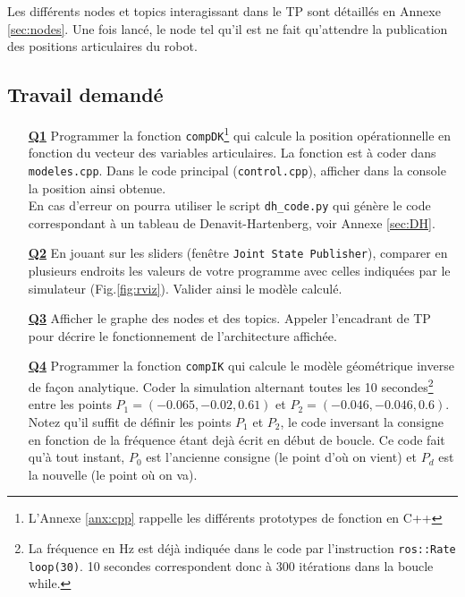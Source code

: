 \documentclass[12pt,a4paper]{article}
\begin{document}
Les différents nodes et topics interagissant dans le TP sont détaillés en Annexe \ref{sec:nodes}.
Une fois lancé, le node tel qu'il est ne fait qu'attendre la publication des positions articulaires du robot.
 
 \subsection{Travail demandé}
 \label{travail2s}

\begin{itemize}
 \medskip\item[\textbf{\underline{Q1}}] Programmer la fonction \texttt{compDK}\footnote{ L'Annexe \ref{anx:cpp} rappelle les différents prototypes de fonction en C++} qui calcule la position opérationnelle en fonction du vecteur des variables articulaires. La fonction est à coder dans \texttt{modeles.cpp}.
 Dans le code principal (\texttt{control.cpp}), afficher dans la console la position ainsi obtenue.\\
 En cas d'erreur on pourra utiliser le script \texttt{dh\_code.py} qui génère le code correspondant à un tableau de Denavit-Hartenberg, voir Annexe \ref{sec:DH}.


  \medskip\item[\textbf{\underline{Q2}}] En jouant sur les sliders (fenêtre \texttt{Joint State Publisher}), comparer en plusieurs endroits les valeurs de votre programme avec celles indiquées par le simulateur (Fig.\ref{fig:rviz}).
 Valider ainsi le modèle calculé.
 
 \medskip\item[\textbf{\underline{Q3}}] Afficher le graphe des nodes et des topics. Appeler l'encadrant de TP pour décrire le fonctionnement de l'architecture affichée. 
 
 \medskip\item[\textbf{\underline{Q4}}] Programmer la fonction \texttt{compIK} qui calcule le modèle géométrique inverse de façon analytique. 
 Coder la simulation alternant toutes les 10 secondes\footnote{La fréquence en Hz est déjà indiquée dans le code par l'instruction \texttt{ros::Rate loop(30)}.
 10 secondes correspondent donc à 300 itérations dans la boucle while.}
 entre les points $P_1=(-0.065,-0.02,0.61)$ et $P_2=(-0.046, -0.046, 0.6)$. \\
 Notez qu'il suffit de définir les points $P_1$ et $P_2$, le code inversant la consigne en fonction de la fréquence étant dejà écrit en début de boucle.
 Ce code fait qu'à tout instant, $P_0$ est l'ancienne consigne (le point d'où on vient) et $P_d$ est la nouvelle (le point où on va).
 

\end{itemize}
\end{document}
